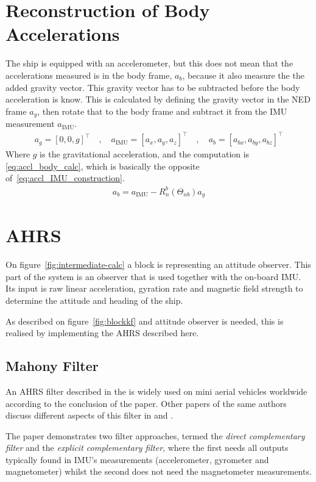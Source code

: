 \section{Reconstruction of Body Accelerations}
The ship is equipped with an accelerometer, but this does not mean
that the accelerations measured is in the body frame, $a_b$, because
it also measure the the added gravity vector. This gravity vector has
to be subtracted before the body acceleration is know. This is
calculated by defining the gravity vector in the NED frame $a_g$, then
rotate that to the body frame and subtract it from the {IMU}
measurement $a_\text{IMU}$.
\begin{align}
a_g = [0, 0, g]^\top \quad, \quad 
a_\text{IMU} = [a_x, a_y, a_z]^\top \quad, \quad 
a_b = [a_{bx}, a_{by}, a_{bz}]^\top
\end{align}
Where $g$ is the gravitational acceleration, and the computation is \vref{eq:accl_body_calc}, which is basically the opposite of~\vref{eq:accl_IMU_construction}.
\begin{align}
a_b = a_\text{IMU} - R_n^b (\Theta_{nb}) a_g
\label{eq:accl_body_calc}
\end{align}


\section{\acl{AHRS}}
On figure~\vref{fig:intermediate-calc} a block is representing an
attitude observer. This part of the system is an observer that is used
together with the on-board \ac{IMU}. Its input is raw linear
acceleration, gyration rate and magnetic field strength to determine
the attitude and heading of the ship.

As described on figure~\vref{fig:blockkf} and attitude observer is
needed, this is realised by implementing the \ac{AHRS} described
here.

\subsection{Mahony Filter}
An \ac{AHRS} filter described in the \citep{mahony} is widely used on
mini aerial vehicles worldwide according to the conclusion of the
paper. Other papers of the same authors discuss different aspects of
this filter in \citep{mahony2} and \citep{mahony3}.

The paper demonstrates two filter approaches, termed the
\textit{direct complementary filter} and the \textit{explicit
complementary filter}, where the first needs all outputs typically
found in \ac{IMU}'s measurements (accelerometer, gyrometer and magnetometer)
whilst the second does not need the magnetometer measurements.

